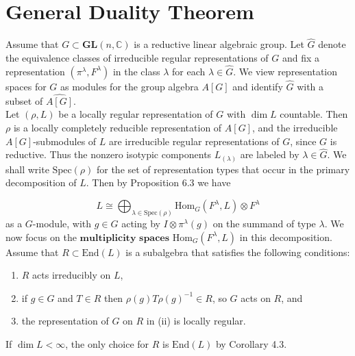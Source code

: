\documentclass[12pt]{article}
\begin{document}
\section{General Duality Theorem}
    Assume that $G \subset \mathbf{GL}(n, \mathbb{C})$ is a reductive linear algebraic group. Let $\widehat{G}$ denote the equivalence classes of irreducible regular representations of $G$ and fix a representation $(\pi^\lambda, F^\lambda)$ in the class $\lambda$ for each $\lambda \in \widehat{G}$. We view representation spaces for $G$ as modules for the group algebra $A[G]$ and identify $\widehat{G}$ with a subset of $\widehat{A[G]}$.\\
    
    Let $(\rho, L)$ be a locally regular representation of $G$ with $\dim L$ countable. Then $\rho$ is a locally completely reducible representation of $A[G]$, and the irreducible $A[G]$-submodules of $L$ are irreducible regular representations of $G$, since $G$ is reductive. Thus the nonzero isotypic components $L_{(\lambda)}$ are labeled by $\lambda \in \widehat{G}$. We shall write $\mathrm{Spec}(\rho)$ for the set of representation types that occur in the primary decomposition of $L$. Then by Proposition 6.3 we have
    
\begin{equation}
    L \cong \bigoplus_{\lambda \in \mathrm{Spec}(\rho)} \mathrm{Hom}_{G}(F^\lambda, L) \otimes F^\lambda
\end{equation}
    as a $G$-module, with $g \in G$ acting by $I \otimes \pi^\lambda(g)$ on the summand of type $\lambda$. We now focus on the $\textbf{multiplicity spaces}$ $\mathrm{Hom}_{G}(F^\lambda, L)$ in this decomposition.\\
    
    Assume that $R \subset \mathrm{End}(L)$ is a subalgebra that satisfies the following conditions:

    \begin{enumerate}[label=(\roman*)]
        \item $R$ acts irreducibly on $L$,
        \item if $g \in G$ and $T \in R$ then $\rho(g) T \rho(g)^{-1} \in R$, so $G$ acts on $R$, and
        \item the representation of $G$ on $R$ in (ii) is locally regular.
    \end{enumerate}

    If $\dim L < \infty$, the only choice for $R$ is $\mathrm{End}(L)$ by Corollary 4.3. \\
    
\end{document}
